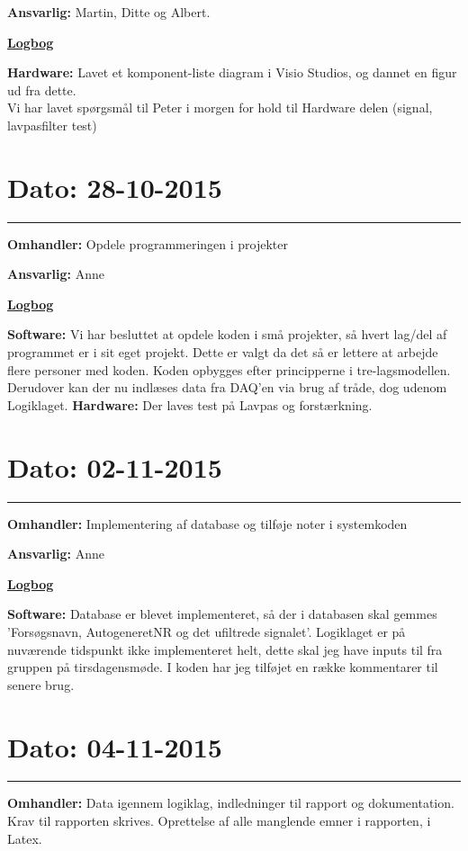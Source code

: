 \textbf{Ansvarlig:} Martin, Ditte og Albert.

\underline{\textbf{Logbog}}

\textbf{Hardware: } Lavet et komponent-liste diagram i Visio Studios, og dannet en figur ud fra dette. 
\\
Vi har lavet spørgsmål til Peter i morgen for hold til Hardware delen (signal, lavpasfilter test)

\section{Dato: 28-10-2015}
\hrule
\textbf{Omhandler:} Opdele programmeringen i projekter

\textbf{Ansvarlig:} Anne

\underline{\textbf{Logbog}}

\textbf{Software: }Vi har besluttet at opdele koden i små projekter, så hvert lag/del af programmet er i sit eget projekt. Dette er valgt da det så er lettere at arbejde flere personer med koden. Koden opbygges efter principperne i tre-lagsmodellen. Derudover kan der nu indlæses data fra DAQ'en via brug af tråde, dog udenom Logiklaget. 
\textbf{Hardware: } Der laves test på Lavpas og forstærkning.  
\\

\section{Dato: 02-11-2015}
\hrule
\textbf{Omhandler:} Implementering af database og tilføje noter i systemkoden

\textbf{Ansvarlig:} Anne

\underline{\textbf{Logbog}}

\textbf{Software: }Database er blevet implementeret, så der i databasen skal gemmes 'Forsøgsnavn, AutogeneretNR og det ufiltrede signalet'. Logiklaget er på nuværende tidspunkt ikke implementeret helt, dette skal jeg have inputs til fra gruppen på tirsdagensmøde.  
I koden har jeg tilføjet en række kommentarer til senere brug.
\\

\section{Dato: 04-11-2015}
\hrule
\textbf{Omhandler:} Data igennem logiklag, indledninger til rapport og dokumentation. Krav til rapporten skrives. 
Oprettelse af alle manglende emner i rapporten, i Latex. 

